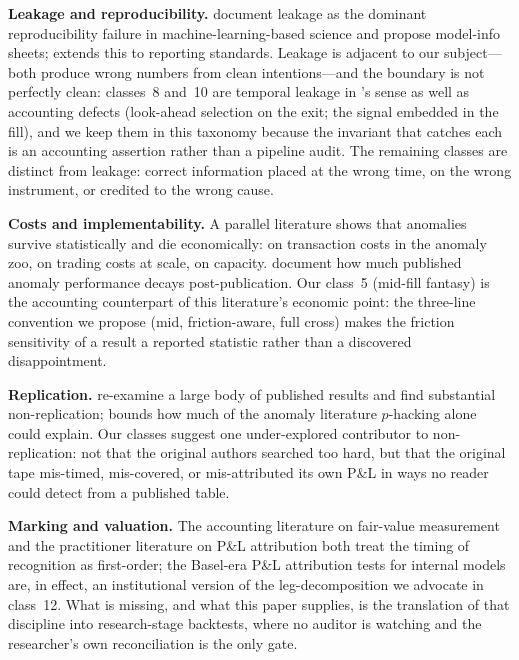 \documentclass[11pt]{article}
\begin{document}
\textbf{Leakage and reproducibility.} \citet{kn} document leakage as the dominant reproducibility
failure in machine-learning-based science and propose model-info sheets; \citet{reforms}
extends this to reporting standards. Leakage is adjacent to
our subject---both produce wrong numbers from clean intentions---and the boundary is not
perfectly clean: classes~8 and~10 are temporal leakage in \citet{kn}'s sense as well as
accounting defects (look-ahead selection on the exit; the signal embedded in the fill), and we
keep them in this taxonomy because the invariant that catches each is an accounting assertion
rather than a pipeline audit. The remaining classes are distinct from leakage: correct
information placed at the wrong time, on the wrong instrument, or credited to the wrong cause.

\textbf{Costs and implementability.} A parallel literature shows that anomalies survive
statistically and die economically: \citet{nvv} on transaction costs in the anomaly zoo,
\citet{fim} on trading costs at scale, \citet{cmp} on capacity. \citet{mp2016} document how
much published anomaly performance decays post-publication. Our class~5 (mid-fill fantasy) is
the accounting counterpart of this literature's economic point: the three-line convention we
propose (mid, friction-aware, full cross) makes the friction sensitivity of a result a
reported statistic rather than a discovered disappointment.

\textbf{Replication.} \citet{hxz} re-examine a large body of published results and find substantial
non-replication; \citet{clarge} bounds how much of the anomaly literature $p$-hacking alone
could explain.
Our classes suggest one under-explored contributor to non-replication: not that the original
authors searched too hard, but that the original tape mis-timed, mis-covered, or mis-attributed
its own P\&L in ways no reader could detect from a published table.

\textbf{Marking and valuation.} The accounting literature on fair-value measurement and the
practitioner literature on P\&L attribution both treat the timing of recognition as
first-order; the Basel-era P\&L attribution tests for internal models are, in effect, an
institutional version of the leg-decomposition we advocate in class~12. What is missing, and
what this paper supplies, is the translation of that discipline into research-stage backtests,
where no auditor is watching and the researcher's own reconciliation is the only gate.
\end{document}
